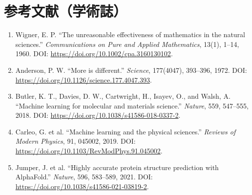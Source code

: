 \section*{参考文献（学術誌）}
\begin{enumerate}[leftmargin=2.4em]
\item Wigner, E. P. ``The unreasonable effectiveness of mathematics in the natural sciences.'' \textit{Communications on Pure and Applied Mathematics}, 13(1), 1--14, 1960. DOI: \url{https://doi.org/10.1002/cpa.3160130102}.
\item Anderson, P. W. ``More is different.'' \textit{Science}, 177(4047), 393--396, 1972. DOI: \url{https://doi.org/10.1126/science.177.4047.393}.
\item Butler, K. T., Davies, D. W., Cartwright, H., Isayev, O., and Walsh, A. ``Machine learning for molecular and materials science.'' \textit{Nature}, 559, 547--555, 2018. DOI: \url{https://doi.org/10.1038/s41586-018-0337-2}.
\item Carleo, G. et al. ``Machine learning and the physical sciences.'' \textit{Reviews of Modern Physics}, 91, 045002, 2019. DOI: \url{https://doi.org/10.1103/RevModPhys.91.045002}.
\item Jumper, J. et al. ``Highly accurate protein structure prediction with AlphaFold.'' \textit{Nature}, 596, 583--589, 2021. DOI: \url{https://doi.org/10.1038/s41586-021-03819-2}.
\end{enumerate}

